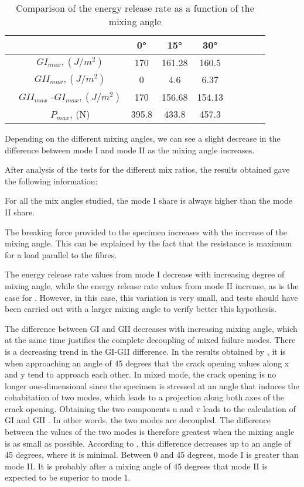 \begin{table} [H]
	\centering
	\begin{tabular}{ccccccccc}
		\toprule %
		&  & 0° & 15° & 30° \\\midrule
		& $GI_{max}, (J/m^2)$ & 170 & 161.28 & 160.5  \\\midrule
		& $GII_{max}, (J/m^2)$ & 0 & 4.6 & 6.37 \\\midrule
		& $GII_{max}$ -$GI_{max}, (J/m^2)$ & 170 & 156.68 & 154.13 \\\midrule
		& $P_{max}$, (N) & 395.8 & 433.8 & 457.3 \\\midrule
	\end{tabular}
	\caption{Comparison of the energy release rate as a function of the mixing angle}
	\label{fig:Comparison_angle}
\end{table}

Depending on the different mixing angles, we can see a slight decrease in the difference between mode I and mode II as the mixing angle increases.

After analysis of the tests for the different mix ratios, the results obtained gave the following information:

For all the mix angles studied, the mode I share is always higher than the mode II share.

The breaking force provided to the specimen increases with the increase of the mixing angle. This can be explained by the fact that the resistance is maximum for a load parallel to the fibres.

The energy release rate values from mode I decrease with increasing degree of mixing angle, while the energy release rate values from mode II increase, as is the case for \cite{Odounga2018phd}. However, in this case, this variation is very small, and tests should have been carried out with a larger mixing angle to verify better this hypothesis.

The difference between GI and GII decreases with increasing mixing angle, which at the same time justifies the complete decoupling of mixed failure modes. There is a decreasing trend in the GI-GII difference. 
In the results obtained by \cite{Odounga2018phd}, it is when approaching an angle of 45 degrees that the crack opening values along x and y tend to approach each other. In mixed mode, the crack opening is no longer one-dimensional since the specimen is stressed at an angle that induces the cohabitation of two modes, which leads to a projection along both axes of the crack opening. Obtaining the two components u and v leads to the calculation of GI and GII . In other words, the two modes are decoupled. The difference between the values of the two modes is therefore greatest when the mixing angle is as small as possible. According to \cite{Odounga2018phd} , this difference decreases up to an angle of 45 degrees, where it is minimal. Between 0 and 45 degrees, mode I is greater than mode II. It is probably after a mixing angle of 45 degrees that mode II is expected to be superior to mode 1.

